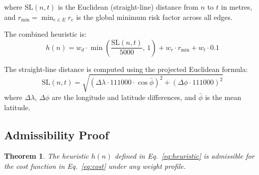 ﻿\documentclass[a4paper, 12pt]{article}
\newtheorem{theorem}{Theorem}
\theoremstyle{remark}
\begin{document}
where $\text{SL}(n,t)$ is the Euclidean (straight-line) distance from $n$ to $t$ in metres, and $r_{\min} = \min_{e \in E} r_e$ is the global minimum risk factor across all edges.

The combined heuristic is:
\begin{equation}
\boxed{
h(n) = w_d \cdot \min\!\left(\frac{\text{SL}(n,t)}{5000},\, 1\right)
     + w_r \cdot r_{\min}
     + w_t \cdot 0.1
}
\label{eq:heuristic}
\end{equation}

The straight-line distance is computed using the projected Euclidean formula:
\[
    \text{SL}(n,t) = \sqrt{(\Delta\lambda \cdot 111000 \cdot \cos\bar{\phi})^2 + (\Delta\phi \cdot 111000)^2}
\]
where $\Delta\lambda$, $\Delta\phi$ are the longitude and latitude differences, and $\bar{\phi}$ is the mean latitude.

\subsection{Admissibility Proof}

\begin{theorem}
The heuristic $h(n)$ defined in Eq.~\ref{eq:heuristic} is admissible for the cost function in Eq.~\ref{eq:cost} under any weight profile.
\end{theorem}
\end{document}
